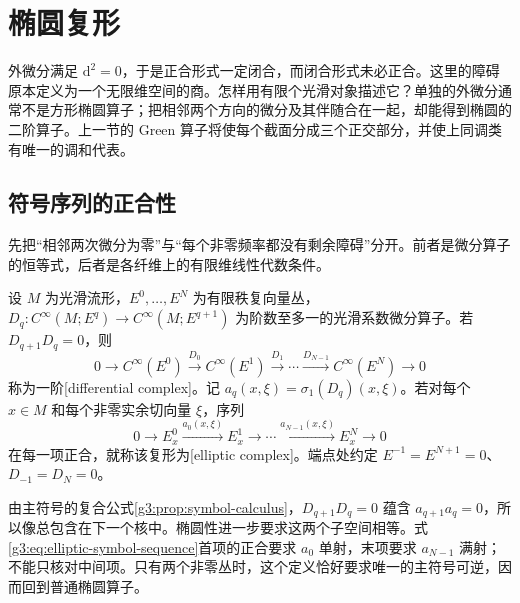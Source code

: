 
% 
% 

\section{椭圆复形}
\label{g3:sec:1304}

外微分满足 \(\mathrm d^2=0\)，于是正合形式一定闭合，而闭合形式未必正合。这里的障碍原本定义为一个无限维空间的商。怎样用有限个光滑对象描述它？单独的外微分通常不是方形椭圆算子；把相邻两个方向的微分及其伴随合在一起，却能得到椭圆的二阶算子。上一节的 Green 算子将使每个截面分成三个正交部分，并使上同调类有唯一的调和代表。

\subsection{符号序列的正合性}
\label{g3:subsec:1304:01}
先把“相邻两次微分为零”与“每个非零频率都没有剩余障碍”分开。前者是微分算子的恒等式，后者是各纤维上的有限维线性代数条件。

\begin{definition}\label{g3:def:first-order-elliptic-complex}
	设 \(M\) 为光滑流形，\(E^0,\ldots,E^N\) 为有限秩复向量丛，\(D_q:C^\infty(M;E^q)\to C^\infty(M;E^{q+1})\) 为阶数至多一的光滑系数微分算子。若 \(D_{q+1}D_q=0\)，则
	\[
		0\longrightarrow C^\infty(E^0)
		\xrightarrow{D_0}C^\infty(E^1)
		\xrightarrow{D_1}\cdots
		\xrightarrow{D_{N-1}}C^\infty(E^N)
		\longrightarrow0
	\]
	称为一阶[differential complex]。记 \(a_q(x,\xi)=\sigma_1(D_q)(x,\xi)\)。若对每个 \(x\in M\) 和每个非零实余切向量 \(\xi\)，序列
	\begin{equation}\label{g3:eq:elliptic-symbol-sequence}
		0\longrightarrow E_x^0\xrightarrow{a_0(x,\xi)}E_x^1
		\longrightarrow\cdots\xrightarrow{a_{N-1}(x,\xi)}E_x^N
		\longrightarrow0
	\end{equation}
	在每一项正合，就称该复形为[elliptic complex]。端点处约定 \(E^{-1}=E^{N+1}=0\)、\(D_{-1}=D_N=0\)。
\end{definition}

由主符号的复合公式\cref{g3:prop:symbol-calculus}，\(D_{q+1}D_q=0\) 蕴含 \(a_{q+1}a_q=0\)，所以像总包含在下一个核中。椭圆性进一步要求这两个子空间相等。式\eqref{g3:eq:elliptic-symbol-sequence}首项的正合要求 \(a_0\) 单射，末项要求 \(a_{N-1}\) 满射；不能只核对中间项。只有两个非零丛时，这个定义恰好要求唯一的主符号可逆，因而回到普通椭圆算子。

